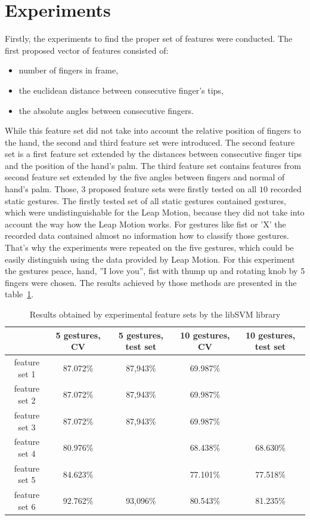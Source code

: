 \section{Experiments}
\label{static:exp}

Firstly, the experiments to find the proper set of features were conducted. The first proposed vector of features consisted of:
\begin{itemize}
\item number of fingers in frame,
\item the euclidean distance between consecutive finger's tips,
\item the absolute angles between consecutive fingers.
\end{itemize} 

While this feature set did not take into account the relative position of fingers to the hand, the second and third feature set were introduced.
The second feature set is a first feature set extended by the distances between consecutive finger tips and the position of the hand's palm.
The third feature set contains features from second feature set extended by the five angles between fingers and normal of hand's palm.
Those, 3 proposed feature sets were firstly tested on all $10$ recorded static gestures.
The firstly tested set of all static gestures contained gestures, which were undistinguishable for the Leap Motion, because they did not take into account the way how the Leap Motion works. 
For gestures like fist or 'X' the recorded data contained almost no information how to classify those gestures.
That's why the experiments were repeated on the five gestures, which could be easily distinguish using the data provided by Leap Motion. 
For this experiment the gestures peace, hand, ''I love you'', fist with thump up and rotating knob by 5 fingers were chosen.
The results achieved by those methods are presented in the table~\ref{staticfeat}.

\begin{table}[htp!]
	\label{staticfeat}
	\caption{Results obtained by experimental feature sets by the libSVM library}
    \begin{tabular}{|c|c|c|c|c|}
    \hline
    ~                                                   & 5 gestures, CV & 5 gestures, test set & 10 gestures, CV  & 10 gestures, test set \\ \hline
    feature set 1                     & 87.072\% & 87,943\% & 69.987\% & ~           \\ \hline
    feature set 2                     & 87.072\% & 87,943\% & 69.987\% & ~          \\ \hline
    feature set 3                     & 87.072\% & 87,943\% & 69.987\% & ~           \\ \hline
    feature set 4                     & 80.976\% & ~  & 68.438\% & 68.630\%          \\ \hline
    feature set 5                     & 84.623\% & ~  & 77.101\% & 77.518\%          \\ \hline
    feature set 6                     & 92.762\% & 93,096\% & 80.543\% & 81.235\%           \\ \hline
    \end{tabular}
\end{table}

